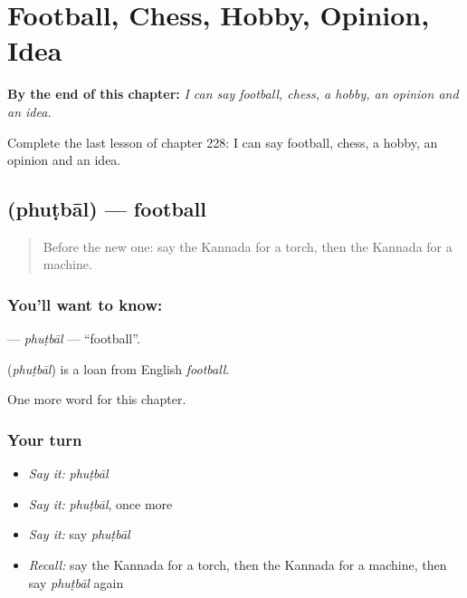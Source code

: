 
\chapter{Football, Chess, Hobby, Opinion, Idea}
\label{ch:ka-football-chess-hobby-opinion-idea}

\begin{chapteropening}
\textbf{By the end of this chapter:} \emph{I can say football, chess, a hobby, an opinion and an idea.}

Complete the last lesson of chapter 228: I can say football, chess, a hobby, an opinion and an idea.
\end{chapteropening}

\section[\texorpdfstring{\kn{ಫುಟ್ಬಾಲ್} (phuṭbāl)}{ಫುಟ್ಬಾಲ್ (phuṭbāl)}]{ (phuṭbāl) — football}

\label{lesson:KA-C228-phutbal}



\begin{quote}
Before the new one: say the Kannada for a torch, then the Kannada for a machine.
\end{quote}

\subsection*{You'll want to know: }
\textbf{} — \emph{phuṭbāl} — \textquotedblleft{}football\textquotedblright{}.

\begin{cousinweb}
\textbf{} (\emph{phuṭbāl}) is a loan from English \emph{football}.
\end{cousinweb}

\begin{grammarlens}[title={What you've built}]
One more word for this chapter.
\end{grammarlens}

\subsection*{Your turn}
\begin{itemize}
\raggedright
  \item \emph{Say it:} \emph{phuṭbāl}
  \item \emph{Say it:} \emph{phuṭbāl}, once more
  \item \emph{Say it:} say \emph{phuṭbāl}
  \item \emph{Recall:} say the Kannada for a torch, then the Kannada for a machine, then say \emph{phuṭbāl} again
\end{itemize}

